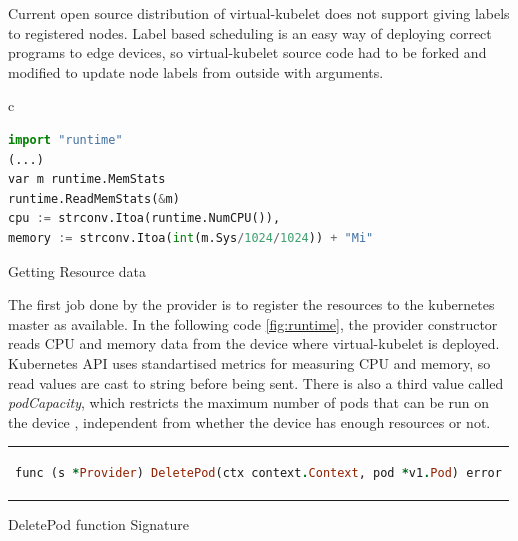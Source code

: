 Current open source distribution of virtual-kubelet does not support giving labels to registered nodes. Label based scheduling is an easy way of deploying correct programs to edge devices, so virtual-kubelet source code had to be forked and modified to update node labels from outside with arguments.
\begin{code}[htpb]
  \centering
  \begin{tabular}{c}
  \begin{lstlisting}[language=python]
import "runtime"
(...)
var m runtime.MemStats
runtime.ReadMemStats(&m)
cpu := strconv.Itoa(runtime.NumCPU()),
memory := strconv.Itoa(int(m.Sys/1024/1024)) + "Mi"

\end{lstlisting}
\end{tabular}
\caption{Getting Resource data}\label{fig:runtime}
\end{code}
The first job done by the provider is to register the resources to the kubernetes master as available. In the following code \ref{fig:runtime}, the provider constructor reads CPU and memory data from the device where virtual-kubelet is deployed. Kubernetes API uses standartised metrics for measuring CPU and memory, so read values are cast to string before being sent. There is also a third value called \textit{podCapacity}, which restricts the maximum number of pods that can be run on the device , independent from whether the device has enough resources or not.


\begin{code}[htpb]
  \centering
  \begin{tabular}{c}
  \begin{lstlisting}[language=ruby]
    func (s *Provider) DeletePod(ctx context.Context, pod *v1.Pod) error
\end{lstlisting}
\end{tabular}
\caption{DeletePod function Signature}\label{fig:signature}
\end{code}

